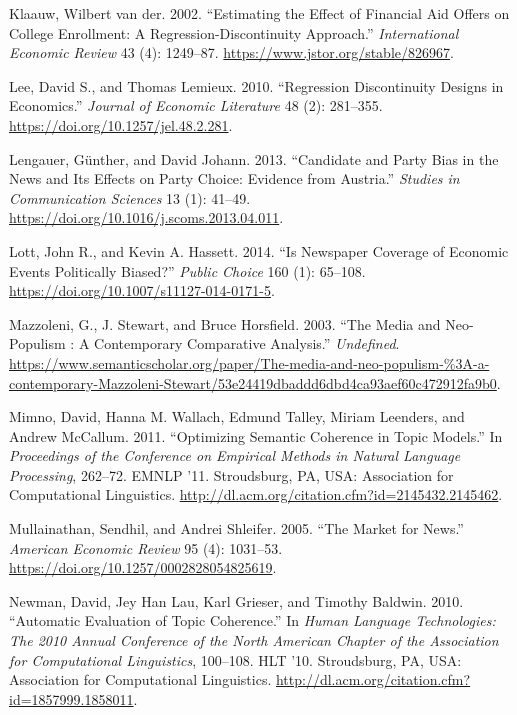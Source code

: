 \documentclass[
  12pt,
]{article}
\newlength{\cslhangindent}
\newlength{\cslentryspacingunit} %
\newenvironment{CSLReferences}[2] %
 {%
  \setlength{\parindent}{0pt}
  \ifodd #1
  \let\oldpar\par
  \def\par{\hangindent=\cslhangindent\oldpar}
  \fi
  \setlength{\parskip}{#2\cslentryspacingunit}
 }%
 {}
\begin{document}
\begin{CSLReferences}{1}{0}
\leavevmode{}%
Klaauw, Wilbert van der. 2002. {``Estimating the {Effect} of {Financial
Aid Offers} on {College Enrollment}: {A Regression-Discontinuity
Approach}.''} \emph{International Economic Review} 43 (4): 1249--87.
\url{https://www.jstor.org/stable/826967}.

\leavevmode{}%
Lee, David S., and Thomas Lemieux. 2010. {``Regression {Discontinuity
Designs} in {Economics}.''} \emph{Journal of Economic Literature} 48
(2): 281--355. \url{https://doi.org/10.1257/jel.48.2.281}.

\leavevmode{}%
Lengauer, Günther, and David Johann. 2013. {``Candidate and Party Bias
in the News and Its Effects on Party Choice: {Evidence} from
{Austria}.''} \emph{Studies in Communication Sciences} 13 (1): 41--49.
\url{https://doi.org/10.1016/j.scoms.2013.04.011}.

\leavevmode{}%
Lott, John R., and Kevin A. Hassett. 2014. {``Is Newspaper Coverage of
Economic Events Politically Biased?''} \emph{Public Choice} 160 (1):
65--108. \url{https://doi.org/10.1007/s11127-014-0171-5}.

\leavevmode{}%
Mazzoleni, G., J. Stewart, and Bruce Horsfield. 2003. {``The Media and
Neo-Populism : A Contemporary Comparative Analysis.''} \emph{Undefined}.
\url{https://www.semanticscholar.org/paper/The-media-and-neo-populism-\%3A-a-contemporary-Mazzoleni-Stewart/53e24419dbaddd6dbd4ca93aef60c472912fa9b0}.

\leavevmode{}%
Mimno, David, Hanna M. Wallach, Edmund Talley, Miriam Leenders, and
Andrew McCallum. 2011. {``Optimizing {Semantic Coherence} in {Topic
Models}.''} In \emph{Proceedings of the {Conference} on {Empirical
Methods} in {Natural Language Processing}}, 262--72. {EMNLP} '11.
{Stroudsburg, PA, USA}: {Association for Computational Linguistics}.
\url{http://dl.acm.org/citation.cfm?id=2145432.2145462}.

\leavevmode{}%
Mullainathan, Sendhil, and Andrei Shleifer. 2005. {``The {Market} for
{News}.''} \emph{American Economic Review} 95 (4): 1031--53.
\url{https://doi.org/10.1257/0002828054825619}.

\leavevmode{}%
Newman, David, Jey Han Lau, Karl Grieser, and Timothy Baldwin. 2010.
{``Automatic {Evaluation} of {Topic Coherence}.''} In \emph{Human
{Language Technologies}: {The} 2010 {Annual Conference} of the {North
American Chapter} of the {Association} for {Computational Linguistics}},
100--108. {HLT} '10. {Stroudsburg, PA, USA}: {Association for
Computational Linguistics}.
\url{http://dl.acm.org/citation.cfm?id=1857999.1858011}.


\end{CSLReferences}
\end{document}
